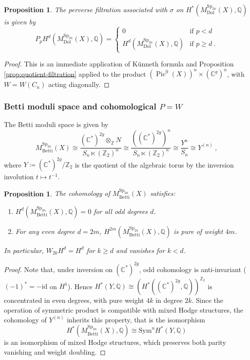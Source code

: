 \documentclass[11pt, a4paper]{amsart}
\newtheorem{proposition}[theorem]{Proposition}
\theoremstyle{definition}
\theoremstyle{myitemstyle}
\newcommand{\Z}{\mathbb{Z}}
\newcommand{\C}{\mathbb{C}}
\DeclareMathOperator{\Sp}{Sp}
\newcommand{\Dol}{{\mathrm{Dol}}}
\newcommand{\Betti}{{\mathrm{Betti}}}
\begin{document}
\begin{proposition}\label{prop:Cn-Dolbeault-filtration}
The perverse filtration associated with $\sigma$ on $H^*(M_{\Dol}^{\Sp_{2n}}(X), \mathbb{Q})$ is given by
\[
P_p H^d(M_{\Dol}^{\Sp_{2n}}(X), \mathbb{Q}) = 
\begin{cases} 
0 & \text{if } p < d \\ 
H^d(M_{\Dol}^{\Sp_{2n}}(X), \mathbb{Q}) & \text{if } p \ge d\ . 
\end{cases}
\]
\end{proposition}
\begin{proof}
This is an immediate application of K\"unneth formula and Proposition \ref{prop:quotient-filtration} applied to the product $\left(\operatorname{Pic}^0(X)\right)^n\times(\mathbb{C}^g)^n$, with $W = W(C_n)$ acting diagonally.
\end{proof}

\subsubsection{Betti moduli space and cohomological $P=W$}

The Betti moduli space is given by
\[
    M_{\Betti}^{\Sp_{2n}}(X) \cong 
    \frac{(\C^*)^{2g}\otimes_\Z N}{S_n \ltimes (\mathbb{Z}_2)^n} \cong
    \frac{((\mathbb{C}^*)^{2g})^n}{S_n \ltimes (\mathbb{Z}_2)^n} \cong 
    \frac{Y^n}{S_n}\cong
    Y^{(n)}\ ,
\]
where $Y \coloneqq (\mathbb{C}^*)^{2g}/\mathbb{Z}_2$ is the quotient of the algebraic torus by the inversion involution $t \mapsto t^{-1}$.

\begin{proposition}\label{prop:Cn-Betti-weights}
The cohomology of $M_{\Betti}^{\Sp_{2n}}(X)$ satisfies:
\begin{enumerate}
    \item $H^d(M_{\Betti}^{\Sp_{2n}}(X), \mathbb{Q}) = 0$ for all odd degrees $d$.
    \item For any even degree $d = 2m$, $H^{2m}(M_{\Betti}^{\Sp_{2n}}(X), \mathbb{Q})$ is pure of weight $4m$.
\end{enumerate}
In particular, $W_{2k} H^d = H^d$ for $k \ge d$ and vanishes for $k < d$.
\end{proposition}
\begin{proof}
Note that, under inversion on $(\mathbb{C}^*)^{2g}$, odd cohomology is anti-invariant ($(-1)^* = -\mathrm{id}$ on $H^1$). Hence $H^*(Y, \mathbb{Q}) \cong (H^*((\mathbb{C}^*)^{2g}, \mathbb{Q}))^{\mathbb{Z}_2}$ is concentrated in even degrees, with pure weight $4k$ in degree $2k$. Since the operation of symmetric product is compatible with mixed Hodge structures, the cohomology of  $Y^{(n)}$ inherits this property, that is the isomorphism
\[
H^*(M_{\Betti}^{\Sp_{2n}}(X), \mathbb{Q}) \cong \mathrm{Sym}^n H^*(Y, \mathbb{Q})
\]
is an isomorphism of mixed Hodge structures, which preserves both parity vanishing and weight doubling.
\end{proof}
\end{document}
